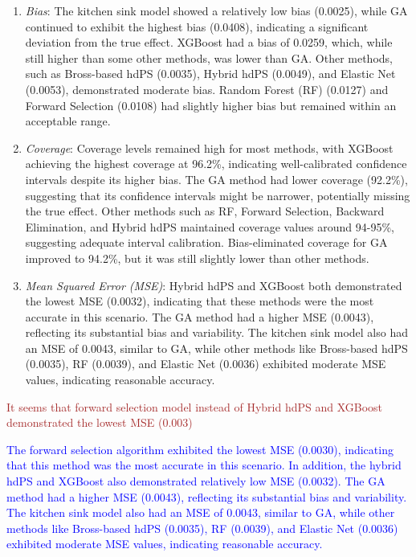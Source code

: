 \documentclass[sn-vancouver,Numbered,lineno,pdflatex]{sn-jnl}
\begin{document}
\begin{enumerate}
\def\labelenumi{\arabic{enumi}.}
\item
  \emph{Bias}: The kitchen sink model showed a relatively low bias
  (0.0025), while GA continued to exhibit the highest bias (0.0408),
  indicating a significant deviation from the true effect. XGBoost had a
  bias of 0.0259, which, while still higher than some other methods, was
  lower than GA. Other methods, such as Bross-based hdPS (0.0035),
  Hybrid hdPS (0.0049), and Elastic Net (0.0053), demonstrated moderate
  bias. Random Forest (RF) (0.0127) and Forward Selection (0.0108) had
  slightly higher bias but remained within an acceptable range.
\item
  \emph{Coverage}: Coverage levels remained high for most methods, with
  XGBoost achieving the highest coverage at 96.2\%, indicating
  well-calibrated confidence intervals despite its higher bias. The GA
  method had lower coverage (92.2\%), suggesting that its confidence
  intervals might be narrower, potentially missing the true effect.
  Other methods such as RF, Forward Selection, Backward Elimination, and
  Hybrid hdPS maintained coverage values around 94-95\%, suggesting
  adequate interval calibration. Bias-eliminated coverage for GA
  improved to 94.2\%, but it was still slightly lower than other
  methods.
\item
  \emph{Mean Squared Error (MSE)}: Hybrid hdPS and XGBoost both
  demonstrated the lowest MSE (0.0032), indicating that these methods
  were the most accurate in this scenario. The GA method had a higher
  MSE (0.0043), reflecting its substantial bias and variability. The
  kitchen sink model also had an MSE of 0.0043, similar to GA, while
  other methods like Bross-based hdPS (0.0035), RF (0.0039), and Elastic
  Net (0.0036) exhibited moderate MSE values, indicating reasonable
  accuracy.
\end{enumerate}

\textcolor{brown}{It seems that forward selection model instead of Hybrid hdPS and XGBoost demonstrated the lowest MSE (0.003)}

\textcolor{blue}{The forward selection algorithm exhibited the lowest MSE (0.0030), indicating that this method was the most accurate in this scenario. In addition, the hybrid hdPS and XGBoost also demonstrated relatively low MSE (0.0032). The GA method had a higher MSE (0.0043), reflecting its substantial bias and variability. The kitchen sink model also had an MSE of 0.0043, similar to GA, while other methods like Bross-based hdPS (0.0035), RF (0.0039), and Elastic Net (0.0036) exhibited moderate MSE values, indicating reasonable accuracy.}
\end{document}
